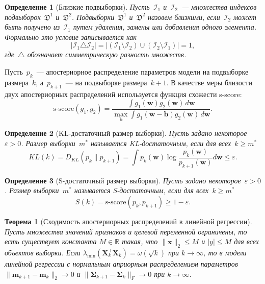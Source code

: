 \documentclass{dissert}
\newtheorem{theorem}{Теорема}
\newtheorem{definition}{Определение}
\begin{document}
\begin{definition}[Близкие подвыборки]
    Пусть~$\mathcal{I}_1$ и~$\mathcal{I}_2$~--- множества индексов подвыборок~$\mathfrak{D}^1$ и~$\mathfrak{D}^2$.
    Подвыборки~$\mathfrak{D}^1$ и~$\mathfrak{D}^2$ назовем близкими, если~$\mathcal{I}_2$ может быть получено из~$\mathcal{I}_1$ путем удаления, замены или добавления одного элемента. Формально это условие записывается как
    \[
        \left| \mathcal{I}_1 \triangle \mathcal{I}_2 \right| = \left| \left( \mathcal{I}_1 \setminus \mathcal{I}_2 \right) \cup \left( \mathcal{I}_2 \setminus \mathcal{I}_1 \right) \right| = 1,
    \]
    где~$\triangle$ обозначает симметрическую разность множеств.
\end{definition}
Пусть~$p_k$~--- апостериорное распределение параметров модели на подвыборке размера~$k$, а~$p_{k+1}$~--- на подвыборке размера~$k+1$. В качестве меры близости двух апостериорных распределений используется функция схожести s-score:
\[
    \mathrm{s\textrm{-}score}(g_1,g_2)
    =
    \frac{\int g_1(\mathbf{w})g_2(\mathbf{w})\,d\mathbf{w}}
         {\max_{\mathbf{b}}\int g_1(\mathbf{w}-\mathbf{b})g_2(\mathbf{w})\,d\mathbf{w}}.
\]

\begin{definition}[KL-достаточный размер выборки]
    Пусть задано некоторое~$\varepsilon > 0$.
    Размер выборки~$m^*$ называется KL-достаточным, если для всех~$k\geqslant m^*$
    \[
        KL(k) = D_{KL}(p_k \| p_{k+1}) = \int p_k(\mathbf{w}) \log{\frac{p_k(\mathbf{w})}{p_{k+1}(\mathbf{w})}} d\mathbf{w} \leqslant \varepsilon.
    \]
\end{definition}

\begin{definition}[S-достаточный размер выборки]
    Пусть задано некоторое~$\varepsilon > 0$.
    Размер выборки~$m^*$ называется S-достаточным, если для всех~$k\geqslant m^*$
    \[
        S(k) = \text{s-score}(p_k, p_{k+1}) \geqslant 1-\varepsilon.
    \]
\end{definition}

\begin{theorem}[Сходимость апостериорных распределений в линейной регрессии]
Пусть множества значений признаков и целевой переменной ограничены, то есть существует константа $M\in\mathbb{R}$ такая, что $\|\mathbf{x}\|_2\leqslant M$ и $|y|\leqslant M$ для всех объектов выборки. Если $\lambda_{\min}\left(\mathbf{X}^{\top}_k \mathbf{X}_k \right) = \omega(\sqrt{k})$ при $k\to \infty$, то в модели линейной регрессии с нормальным априорным распределением параметров $\|\mathbf{m}_{k+1} - \mathbf{m}_k\|_2\to 0$ и $\|\boldsymbol{\Sigma}_{k+1} - \boldsymbol{\Sigma}_k\|_{F}\to 0$ при $k\to \infty$.
\end{theorem}
\end{document}
